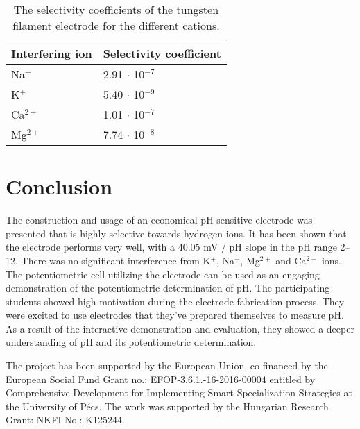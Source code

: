 \documentclass[manuscript=article, journal=jceda8]{achemso}
\begin{document}
\begin{table}[]
\caption{The selectivity coefficients of the tungsten filament electrode for the different cations.}
\label{table:selectivity}
\begin{tabular}{ll}
Interfering ion & Selectivity coefficient \\
\hline
Na$^+$             & 2.91 $\cdot$ 10$^{-7}$              \\
K$^+$              & 5.40 $\cdot$ 10$^{-9}$              \\
Ca$^{2+}$            & 1.01 $\cdot$ 10$^{-7}$              \\
Mg$^{2+}$            & 7.74 $\cdot$ 10$^{-8}$            
\end{tabular}
\end{table}

\section{Conclusion}
	
The construction and usage of an economical pH sensitive electrode was presented that is highly selective towards hydrogen ions. It has been shown that the electrode performs very well, with a 40.05 mV / pH slope in the pH range 2--12. There was no significant interference from K$^+$, Na$^+$, Mg$^{2+}$ and Ca$^{2+}$ ions.
The potentiometric cell utilizing the electrode can be used as an engaging demonstration of the potentiometric determination of pH. The participating students showed high motivation during the electrode fabrication process. They were excited to use electrodes that they've prepared themselves to measure pH. As a result of the interactive demonstration and evaluation, they showed a deeper understanding of pH and its potentiometric determination.




\begin{acknowledgement}
The project has been supported by the European Union, co-financed by the European Social Fund Grant no.: EFOP-3.6.1.-16-2016-00004 entitled by Comprehensive Development for Implementing Smart Specialization Strategies at the University of Pécs. The work was supported by the Hungarian Research Grant: NKFI No.: K125244.
\end{acknowledgement}


\end{document}
